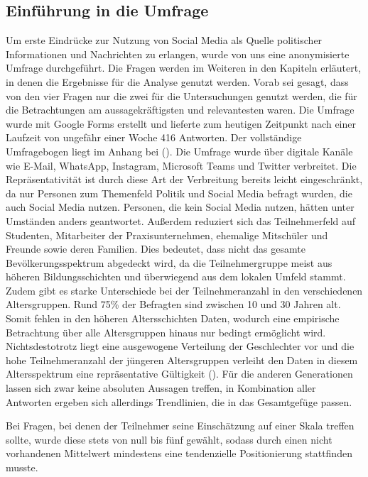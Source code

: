 \subsection{Einführung in die Umfrage}
Um erste Eindrücke zur Nutzung von Social Media als Quelle politischer Informationen und Nachrichten zu erlangen, wurde von uns eine anonymisierte Umfrage durchgeführt. Die Fragen werden im Weiteren in den Kapiteln erläutert, in denen die Ergebnisse für die Analyse genutzt werden. Vorab sei gesagt, dass von den vier Fragen nur die zwei für die Untersuchungen genutzt werden, die für die Betrachtungen am aussagekräftigsten und relevantesten waren. Die Umfrage wurde mit Google Forms erstellt und lieferte zum heutigen Zeitpunkt nach einer Laufzeit von ungefähr einer Woche 416 Antworten. Der vollständige Umfragebogen liegt im Anhang bei (\autocite[]{fig:umfrage}). Die Umfrage wurde über digitale Kanäle wie E-Mail, WhatsApp, Instagram, Microsoft Teams und Twitter verbreitet. Die Repräsentativität ist durch diese Art der Verbreitung bereits leicht eingeschränkt, da nur Personen zum Themenfeld \glqq Politik und Social Media\grqq{} befragt wurden, die auch Social Media nutzen. Personen, die kein Social Media nutzen, hätten unter Umständen anders geantwortet. Außerdem reduziert sich das Teilnehmerfeld auf Studenten, Mitarbeiter der Praxisunternehmen, ehemalige Mitschüler und Freunde sowie deren Familien. Dies bedeutet, dass nicht das gesamte Bevölkerungsspektrum abgedeckt wird, da die Teilnehmergruppe meist aus höheren Bildungsschichten und überwiegend aus dem lokalen Umfeld stammt. Zudem gibt es starke Unterschiede bei der Teilnehmeranzahl in den verschiedenen Altersgruppen. Rund 75\% der Befragten sind zwischen 10 und 30 Jahren alt. Somit fehlen in den höheren Altersschichten Daten, wodurch eine empirische Betrachtung über alle Altersgruppen hinaus nur bedingt ermöglicht wird. Nichtsdestotrotz liegt eine ausgewogene Verteilung der Geschlechter vor und die hohe Teilnehmeranzahl der jüngeren Altersgruppen verleiht den Daten in diesem Altersspektrum eine repräsentative Gültigkeit (\autocite[]{fig:geschlecht}). Für die anderen Generationen lassen sich zwar keine absoluten Aussagen treffen, in Kombination aller Antworten ergeben sich allerdings Trendlinien, die in das Gesamtgefüge passen.

Bei Fragen, bei denen der Teilnehmer seine Einschätzung auf einer Skala treffen sollte, wurde diese stets von null bis fünf gewählt, sodass durch einen nicht vorhandenen Mittelwert mindestens eine tendenzielle Positionierung stattfinden musste.

